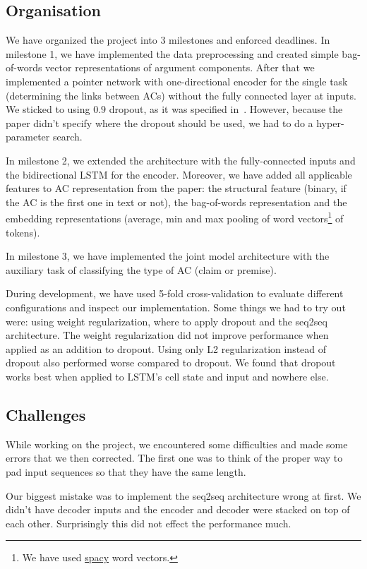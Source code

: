 \documentclass[onecolumn]{article}
\begin{document}
\subsection{Organisation}
We have organized the project into 3 milestones and enforced deadlines.
In milestone 1, we have implemented the data preprocessing and created simple bag-of-words vector representations of argument components.
After that we implemented a pointer network with one-directional encoder for the single task (determining the links between ACs) without the fully connected layer at inputs.
We sticked to using $0.9$ dropout, as it was specified in~\cite{potash2017here}.
However, because the paper didn't specify where the dropout should be used, we had to do a hyper-parameter search.

In milestone 2, we extended the architecture with the fully-connected inputs and the bidirectional LSTM for the encoder.
Moreover, we have added all applicable features to AC representation from the paper: the structural feature
(binary, if the AC is the first one in text or not), the bag-of-words representation and the embedding representations (average, min and max pooling
of word vectors\footnote{We have used \href{https://github.com/explosion/spacy-models/releases/tag/en_vectors_web_lg-2.0.0}{spacy} word vectors.} of tokens).

In milestone 3, we have implemented the joint model architecture with the auxiliary task of classifying the type of AC (claim or premise).

During development, we have used 5-fold cross-validation to evaluate different configurations and inspect our implementation.
Some things we had to try out were: using weight regularization, where to apply dropout and the seq2seq architecture.
The weight regularization did not improve performance when applied as an addition to dropout.
Using only L2 regularization instead of dropout also performed worse compared to dropout.
We found that dropout works best when applied to LSTM's cell state and input and nowhere else.

\subsection{Challenges}
While working on the project, we encountered some difficulties and made some errors that we then corrected. The first one
was to think of the proper way to pad input sequences so that they have the same length.

Our biggest mistake was to implement the seq2seq architecture wrong at first. We didn't have decoder inputs and the encoder and decoder were stacked on top of each other. Surprisingly this did not effect the performance much.
\end{document}
